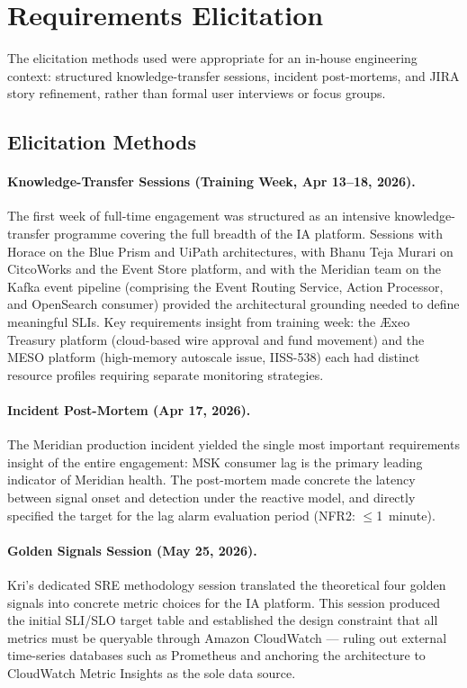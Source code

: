 \section{Requirements Elicitation}
\label{sec:requirements_elicitation}

The elicitation methods used were appropriate for an
in-house engineering context: structured knowledge-transfer sessions,
incident post-mortems, and JIRA story refinement, rather than formal
user interviews or focus groups.

\subsection{Elicitation Methods}

\paragraph{Knowledge-Transfer Sessions (Training Week, Apr 13--18, 2026).}
The first week of full-time engagement was structured as an intensive
knowledge-transfer programme covering the full breadth of the IA
platform. Sessions with Horace on the Blue Prism and UiPath
architectures, with Bhanu Teja Murari on CitcoWorks and the Event Store
platform, and with the Meridian team on the Kafka event pipeline
(comprising the Event Routing Service, Action Processor, and OpenSearch
consumer) provided the architectural grounding needed to define
meaningful SLIs. Key requirements insight from training week: the
\AE xeo Treasury platform (cloud-based wire approval and fund movement)
and the MESO platform (high-memory autoscale issue, IISS-538) each
had distinct resource profiles requiring separate monitoring strategies.

\paragraph{Incident Post-Mortem (Apr 17, 2026).}
The Meridian production incident yielded the single most important
requirements insight of the entire engagement: MSK consumer
lag is the primary leading indicator of Meridian health. The
post-mortem made concrete the latency between signal onset and
detection under the reactive model, and directly specified the target
for the lag alarm evaluation period (NFR2: $\leq$1~minute).

\paragraph{Golden Signals Session (May 25, 2026).}
Kri's dedicated SRE methodology session translated the theoretical
four golden signals into concrete metric choices for the IA platform.
This session produced the initial SLI/SLO target table and established
the design constraint that all metrics must be queryable through
Amazon CloudWatch --- ruling out external time-series databases such as
Prometheus and anchoring the architecture to CloudWatch Metric Insights
as the sole data source.

